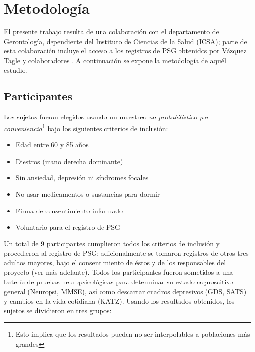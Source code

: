 
\chapter{Metodología}

El presente trabajo resulta de una colaboración con el departamento de Gerontología, dependiente 
del Instituto de Ciencias de la Salud (ICSA); parte de esta colaboración incluye el acceso a los 
registros de PSG obtenidos por Vázquez Tagle y colaboradores \cite{VazquezTagle16}. 
A continuación se expone la metodología de aquél estudio.%

\section{Participantes}

Los sujetos fueron elegidos usando un muestreo \textit{no probabilístico por 
conveniencia}\footnote{Esto implica que los resultados pueden  no ser interpolables a poblaciones 
más grandes} bajo los siguientes criterios de inclusión:
\begin{itemize}
\item Edad entre 60 y 85 años
\item Diestros (mano derecha dominante)
\item Sin ansiedad, depresión ni síndromes focales
\item No usar medicamentos o sustancias para dormir
\item Firma de consentimiento informado
\item Voluntario para el registro de PSG
\end{itemize}

Un total de 9 participantes cumplieron todos los criterios de inclusión y procedieron al registro 
de PSG; adicionalmente se tomaron registros de otros tres adultos mayores, bajo el consentimiento 
de éstos y de los responsables del proyecto (ver más adelante).
%
Todos los participantes fueron sometidos a una batería de pruebas neuropsicológicas para determinar
su estado cognoscitivo general (Neuropsi, MMSE), así como descartar cuadros depresivos (GDS, SATS) 
y cambios en la vida cotidiana (KATZ).
Usando los resultados obtenidos, los sujetos se dividieron en tres grupos:


